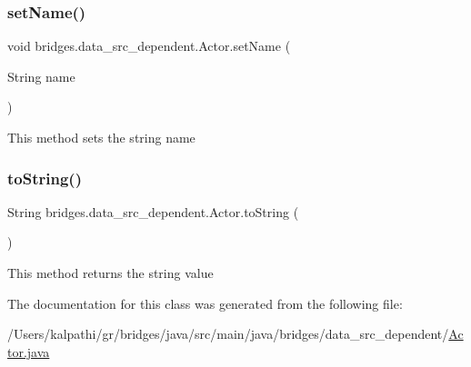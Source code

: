 \mbox{\label{classbridges_1_1data__src__dependent_1_1_actor_a8a3650b446402d511bb4fe99827ff90a}} 
\subsubsection{\texorpdfstring{setName()}{setName()}}
{\footnotesize\ttfamily void bridges.\+data\+\_\+src\+\_\+dependent.\+Actor.\+set\+Name (\begin{DoxyParamCaption}\item[{String}]{name }\end{DoxyParamCaption})}

This method sets the string name \mbox{\label{classbridges_1_1data__src__dependent_1_1_actor_a5210a5b38a4a311b92e7332aeddb65ff}} 
\subsubsection{\texorpdfstring{toString()}{toString()}}
{\footnotesize\ttfamily String bridges.\+data\+\_\+src\+\_\+dependent.\+Actor.\+to\+String (\begin{DoxyParamCaption}{ }\end{DoxyParamCaption})}

This method returns the string value 

The documentation for this class was generated from the following file\+:\begin{DoxyCompactItemize}
\item 
/\+Users/kalpathi/gr/bridges/java/src/main/java/bridges/data\+\_\+src\+\_\+dependent/\mbox{\hyperlink{_actor_8java}{Actor.\+java}}\end{DoxyCompactItemize}

